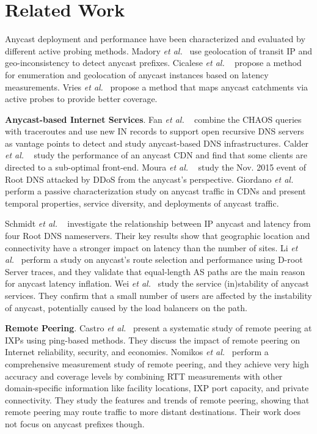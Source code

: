 
\section{Related Work}
\label{sec:rel}
Anycast deployment and performance have been characterized and evaluated by different active probing methods. Madory \emph{et al.}~\cite{madory2013anycasters} use geolocation of transit IP and geo-inconsistency to detect anycast prefixes. Cicalese \emph{et al.} ~\cite{cicalese2015characterizing, cicalese2015fistful, cicalese2018longitudinal} propose a method for enumeration and geolocation of anycast instances based on latency measurements. Vries \emph{et al.}~\cite{deVries:2017} propose a method that maps anycast catchments via active probes to provide better coverage. 

\textbf{Anycast-based Internet Services}.
Fan \emph{et al.} ~\cite{fan2013} combine the CHAOS queries with traceroutes and use new IN records to support open recursive DNS servers as vantage points to detect and study anycast-based DNS infrastructures.
Calder \emph{et al.} ~\cite{Calder:2015} study the performance of an anycast CDN and find that some clients are directed to a sub-optimal front-end.
Moura \emph{et al.} ~\cite{moura2016anycast} study the Nov. 2015 event of Root DNS attacked by DDoS from the anycast's perspective. 
Giordano \emph{et al.}~\cite{giordano2016first} perform a passive characterization study on anycast traffic in CDNs and present temporal properties, service diversity, and deployments of anycast traffic.

Schmidt \emph{et al.} ~\cite{de2017anycast} investigate the relationship between IP anycast and latency from four Root DNS nameservers. Their key results show that geographic location and connectivity have a stronger impact on latency than the number of sites. 
Li \emph{et al.}~\cite{li2018internet} perform a study on anycast's route selection and performance using D-root Server traces, and they validate that equal-length AS paths are the main reason for anycast latency inflation.
Wei \emph{et al.}~\cite{wei2018does} study the service (in)stability of anycast services. They confirm that a small number of users are affected by the instability of anycast, potentially caused by the load balancers on the path.

\textbf{Remote Peering}.
Castro \emph{et al.}~\cite{castro2014remote} present a systematic study of remote peering at IXPs using ping-based methods. They discuss the impact of remote peering on Internet reliability, security, and economies.
Nomikos \emph{et al.}~\cite{Nomikos18} perform a comprehensive measurement study
of remote peering, and they achieve very high accuracy and coverage levels by
combining RTT measurements with other domain-specific information like facility
locations, IXP port capacity, and private connectivity. They study the features
and trends of remote peering, showing that remote peering may route traffic to
more distant destinations. Their work does not focus on anycast prefixes though.

